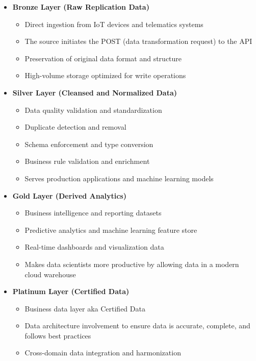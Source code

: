 \documentclass[12pt, a4paper]{article} %
\begin{document}
\begin{itemize}
    \item \textbf{Bronze Layer (Raw Replication Data)}
    \begin{itemize}
        \item Direct ingestion from IoT devices and telematics systems
        \item The source initiates the POST (data transformation request) to the API
        \item Preservation of original data format and structure
        \item High-volume storage optimized for write operations
    \end{itemize}
    
    \item \textbf{Silver Layer (Cleansed and Normalized Data)}
    \begin{itemize}
        \item Data quality validation and standardization
        \item Duplicate detection and removal
        \item Schema enforcement and type conversion
        \item Business rule validation and enrichment
        \item Serves production applications and machine learning models
    \end{itemize}
    
    \item \textbf{Gold Layer (Derived Analytics)}
    \begin{itemize}
        \item Business intelligence and reporting datasets
        \item Predictive analytics and machine learning feature store
        \item Real-time dashboards and visualization data
        \item Makes data scientists more productive by allowing data in a modern cloud warehouse
    \end{itemize}
    
    \item \textbf{Platinum Layer (Certified Data)}
    \begin{itemize}
        \item Business data layer aka Certified Data
        \item Data architecture involvement to ensure data is accurate, complete, and follows best practices
        \item Cross-domain data integration and harmonization
    \end{itemize}
\end{itemize}
\end{document}
